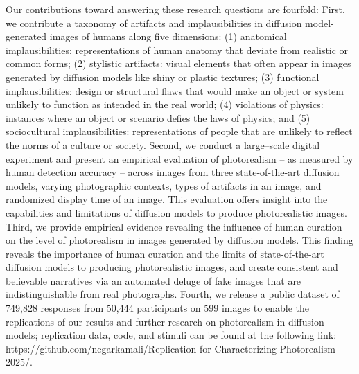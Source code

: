 Our contributions toward answering these research questions are fourfold: First, we contribute a taxonomy of artifacts and implausibilities in diffusion model-generated images of humans along five dimensions: (1) anatomical implausibilities: representations of human anatomy that deviate from realistic or common forms; (2) stylistic artifacts: visual elements that often appear in images generated by diffusion models like shiny or plastic textures; (3) functional implausibilities: design or structural flaws that would make an object or system unlikely to function as intended in the real world; (4) violations of physics: instances where an object or scenario defies the laws of physics; and (5) sociocultural implausibilities: representations of people that are unlikely to reflect the norms of a culture or society. Second, we conduct a large--scale digital experiment and present an empirical evaluation of photorealism – as measured by human detection accuracy – across images from three state-of-the-art diffusion models, varying photographic contexts, types of artifacts in an image, and randomized display time of an image. This evaluation offers insight into the capabilities and limitations of diffusion models to produce photorealistic images. Third, we provide empirical evidence revealing the influence of human curation on the level of photorealism in images generated by diffusion models. This finding reveals the importance of human curation and the limits of state-of-the-art diffusion models to producing photorealistic images, and create consistent and believable narratives via an automated deluge of fake images that are indistinguishable from real photographs. Fourth, we release a public dataset of 749,828 responses from 50,444 participants on 599 images to enable the replications of our results and further research on photorealism in diffusion models; replication data, code, and stimuli can be found at the following link: https://github.com/negarkamali/Replication-for-Characterizing-Photorealism-2025/.